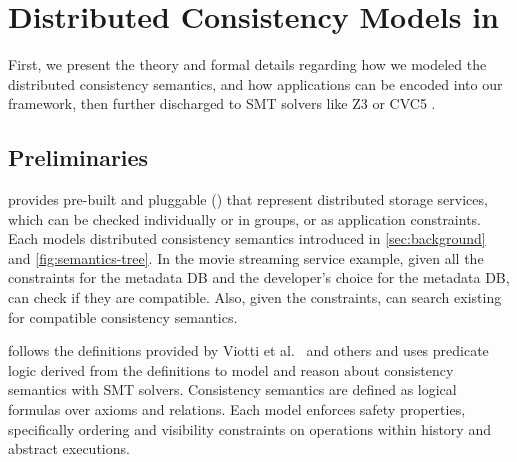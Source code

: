 \section{Distributed Consistency Models in \sysname{}}
\label{sec:design}

First, we present the theory and formal details regarding how we modeled
the distributed consistency semantics, and how applications can be
encoded into our \sysname{} framework, then further discharged to
SMT solvers like Z3 \cite{demoura2008z3} or CVC5 \cite{barbosa2022cvc5}.

\subsection{Preliminaries}

\sysname{} provides pre-built and pluggable \sysmodlongs{} (\sysmods{})
that represent distributed storage services, which can be checked individually or in groups,
or as application constraints.
Each \sysmod{} models distributed consistency semantics introduced in
\cref{sec:background} and \cref{fig:semantics-tree}.
In the movie streaming service example, given all the constraints for the
metadata DB and the developer's \sysmod{} choice for the metadata DB,
\sysname{} can check if they are compatible. Also, given the constraints,
\sysname{} can search existing \sysmods{} for compatible
consistency semantics.

\sysname{} follows the definitions provided by
Viotti et al.~\cite{viotti2016consistency} and others
\cite{terry1994session, baldoni2002an, burckhardt2014principles}
and uses predicate logic derived from the definitions to
model \sysmods{} and reason about consistency semantics with SMT solvers.
Consistency semantics are defined as logical formulas over axioms and
relations. Each model enforces safety properties, specifically ordering and
visibility constraints on operations within history and abstract
executions.

